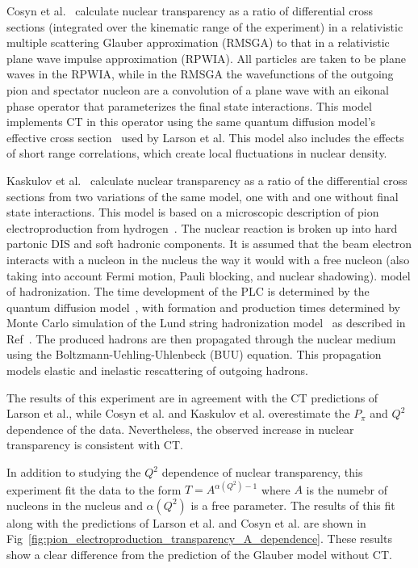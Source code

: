 Cosyn et al.~\cite{Cosyn_2008} calculate nuclear transparency as a ratio of
differential cross sections (integrated over the kinematic range of the
experiment) in a relativistic multiple scattering Glauber approximation (RMSGA)
to that in a relativistic plane wave impulse approximation (RPWIA).
All particles are taken to be plane waves in the RPWIA, while in the RMSGA
the wavefunctions of the outgoing pion and spectator nucleon are a convolution
of a plane wave with an eikonal phase operator that parameterizes the final
state interactions.
This model implements CT in this operator using the same quantum
diffusion model's effective cross section~\cite{Farrar_1988} used by Larson et
al.
This model also includes the effects of short range correlations, which create
local fluctuations in nuclear density.


Kaskulov et al.~\cite{Kaskulov_2009, Kaskulov_2012} calculate nuclear
transparency as a ratio of the differential cross sections from two variations
of the same model, one with and one without final state interactions.
This model is based on a microscopic description of pion
electroproduction from hydrogen~\cite{Kaskulov_2008}.
The nuclear reaction is broken up into hard partonic DIS and soft hadronic components.
It is assumed that the beam electron interacts with a
nucleon in the nucleus the way it would with a free nucleon (also taking into
account Fermi motion, Pauli blocking, and nuclear shadowing).
model of hadronization.
The time development of the PLC is determined by the quantum diffusion
model~\cite{Farrar_1988}, with formation and production times determined by
Monte Carlo simulation of the Lund string hadronization
model~\cite{Anderson_1983} as described in Ref~\cite{Gallmeister_2005}.
The produced hadrons are then propagated through the nuclear medium using the
Boltzmann-Uehling-Uhlenbeck (BUU) equation.
This propagation models elastic and inelastic rescattering of outgoing hadrons.


The results of this experiment are in agreement with the CT predictions of
Larson et al., while Cosyn et al. and Kaskulov et al. overestimate the $P_\pi$
and $Q^2$ dependence of the data.
Nevertheless, the observed increase in nuclear transparency is consistent with
CT.


In addition to studying the $Q^2$ dependence of nuclear transparency, this
experiment fit the data to the form $T=A^{\alpha(Q^2)-1}$ where $A$ is the
numebr of nucleons in the nucleus and $\alpha(Q^2)$ is a free parameter.
The results of this fit along with the predictions of Larson et al. and Cosyn et
al. are shown in Fig~\ref{fig:pion_electroproduction_transparency_A_dependence}.
These results show a clear difference from the prediction of the Glauber model
without CT.

